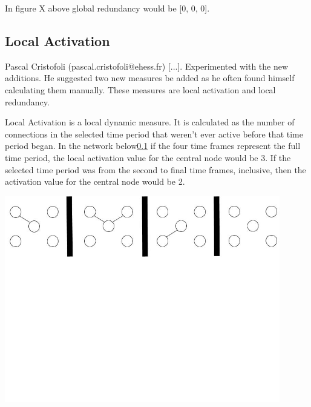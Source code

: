 In figure X above global redundancy would be [0, 0, 0].





\subsection{Local Activation}

Pascal Cristofoli (pascal.cristofoli@ehess.fr) [...]. Experimented with the new additions. He suggested two new measures be added as he often found himself calculating them manually. These measures are local activation and local redundancy.

Local Activation is a local dynamic measure. It is calculated as the number of connections in the selected time period that weren't ever active before that time period began. In the network below\ref{} if the four time frames represent the full time period, the local activation value for the central node would be 3. If the selected time period was from the second to final time frames, inclusive, then the activation value for the central node would be 2.
\begin{center}
\includegraphics[trim={0 10cm 0 -1cm}, width=120mm]{./Figures/localActivation1.jpg}
\end{center}

